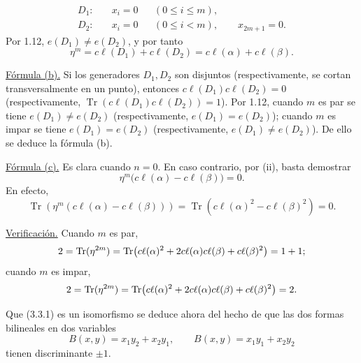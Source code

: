 \pageoriginale

\begin{align*}
D_1:&\quad x_i=0 &&(0\leq i\leq m),\\
D_2:&\quad x_i=0 &&(0\leq i<m),\qquad x_{2m+1}=0.
\end{align*}
Por 1.12, $e(D_1)\neq e(D_2)$, y por tanto
\begin{equation*}
\eta^m=c\ell(D_1)+c\ell(D_2)
=c\ell(\alpha)+c\ell(\beta).
\end{equation*}


\underline{Fórmula (b).} Si los generadores $D_1,D_2$ son disjuntos
(respectivamente, se cortan transversalmente en un punto), entonces
$c\ell(D_1)c\ell(D_2)=0$ (respectivamente,
$\operatorname{Tr}(c\ell(D_1)c\ell(D_2))=1$). Por 1.12, cuando $m$ es par
se tiene $e(D_1)\neq e(D_2)$ (respectivamente,
$e(D_1)=e(D_2)$); cuando $m$ es impar se tiene $e(D_1)=e(D_2)$
(respectivamente, $e(D_1)\neq e(D_2)$). De ello se deduce la fórmula (b).

\underline{Fórmula (c).} Es clara cuando $n=0$. En caso contrario, por
(ii), basta demostrar
\begin{equation*}
\eta^m\bigl(c\ell(\alpha)-c\ell(\beta)\bigr)=0.
\end{equation*}
En efecto,
\begin{equation*}
\operatorname{Tr}\!\left(
\eta^m(c\ell(\alpha)-c\ell(\beta))\right)
=\operatorname{Tr}\!\left(c\ell(\alpha)^2-c\ell(\beta)^2\right)=0.
\end{equation*}

\underline{Verificación.} Cuando $m$ es par,
\begin{equation*}
2=\operatorname{Tr}(\sisi{\eta^2}{\eta^{2m}})
=\operatorname{Tr}\!\left(
\sisi{c\ell(\alpha^2)}{c\ell(\alpha)^2}
+2c\ell(\alpha)c\ell(\beta)+c\ell(\beta)^2\right)=1+1;
\end{equation*}
cuando $m$ es impar,
\begin{equation*}
2=\operatorname{Tr}(\sisi{\eta^2}{\eta^{2m}})
=\operatorname{Tr}\!\left(c\ell(\alpha)^2
+2c\ell(\alpha)c\ell(\beta)+c\ell(\beta)^2\right)=2.
\end{equation*}


Que (3.3.1) es un isomorfismo se deduce ahora del hecho de que las dos
formas bilineales en dos variables
\begin{equation*}
B(x,y)=x_1y_2+x_2y_1,
\qquad
B(x,y)=x_1y_1+x_2y_2
\end{equation*}
tienen discriminante $\pm1$.

\pageoriginale

